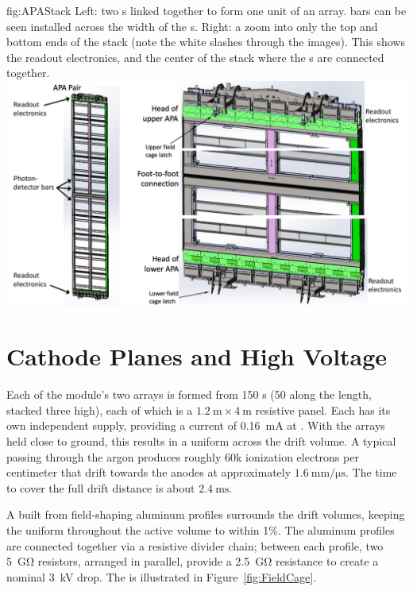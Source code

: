 \begin{dunefigure}{fig:APAStack}
{Left: two s linked together to form one unit of an  array.  bars can be seen installed across the width of the s. Right: a zoom into only the top and bottom ends of the  stack (note the white slashes through the images). This shows the readout electronics, and the center of the stack where the s are connected together.}
\includegraphics[width=\textwidth]{graphics/APAStack.pdf}
\end{dunefigure}

\section{Cathode Planes and High Voltage}

Each of the module's two  arrays is formed from 150 s (50 along the length, stacked three high), each of which is a $\SI{1.2}{\meter}\times\SI{4}{\meter}$ resistive panel. Each  has its own independent  supply, providing a current of \SI{0.16}{\milli\ampere} at \sptargetdriftvolt{}. 
With the   arrays held close to ground, this results in a uniform \spmaxfield \efield across the drift volume.  A typical  passing through the argon produces roughly 60k ionization electrons per centimeter that drift towards the anodes at approximately $\SI{1.6}{\mm/\micro\second}$. The time to cover the full drift distance is about $\SI{2.4}{\milli\second}$.

A  built from field-shaping aluminum profiles surrounds the drift volumes, keeping  the \efield uniform throughout the active  volume to within 1\%.  The aluminum profiles are connected together via a resistive divider chain; between each profile, two \SI{5}{\giga\ohm} resistors, arranged in parallel, provide a \SI{2.5}{\giga\ohm} resistance to create a nominal \SI{3}{\kilo\volt} drop. The  is illustrated in Figure~\ref{fig:FieldCage}.

